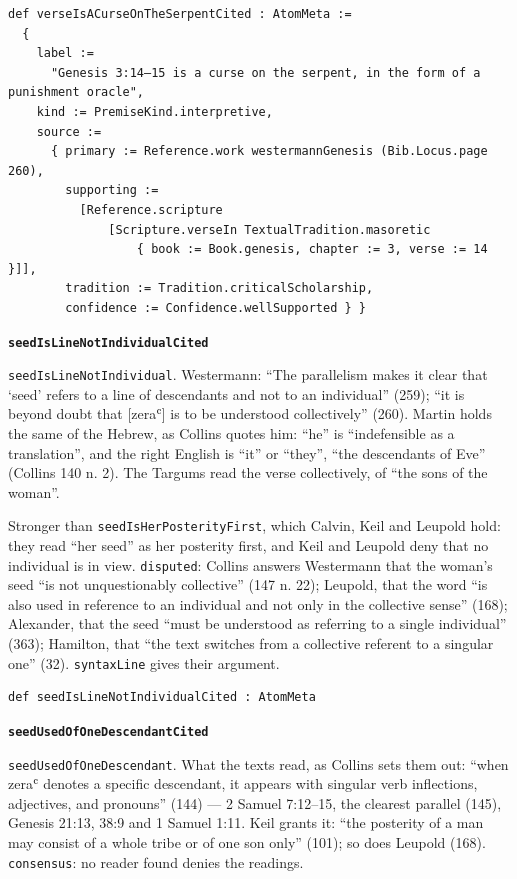 \documentclass[11pt]{article}
\begin{document}
{\small\begin{verbatim}
def verseIsACurseOnTheSerpentCited : AtomMeta :=
  {
    label :=
      "Genesis 3:14–15 is a curse on the serpent, in the form of a punishment oracle",
    kind := PremiseKind.interpretive,
    source :=
      { primary := Reference.work westermannGenesis (Bib.Locus.page 260),
        supporting :=
          [Reference.scripture
              [Scripture.verseIn TextualTradition.masoretic
                  { book := Book.genesis, chapter := 3, verse := 14 }]],
        tradition := Tradition.criticalScholarship,
        confidence := Confidence.wellSupported } }
\end{verbatim}}
\par\medskip\noindent\textbf{\texttt{seed\allowbreak{}Is\allowbreak{}Line\allowbreak{}Not\allowbreak{}Individual\allowbreak{}Cited}}\par\nobreak\noindent
\texttt{seed\allowbreak{}Is\allowbreak{}Line\allowbreak{}Not\allowbreak{}Individual}. Westermann: “The parallelism makes it clear that ‘seed’ refers to a line of descendants and not to an individual” (259); “it is beyond doubt that [zeraʿ] is to be understood collectively” (260). Martin holds the same of the Hebrew, as Collins quotes him: “he” is “indefensible as a translation”, and the right English is “it” or “they”, “the descendants of Eve” (Collins 140 n. 2). The Targums read the verse collectively, of “the sons of the woman”.

Stronger than \texttt{seed\allowbreak{}Is\allowbreak{}Her\allowbreak{}Posterity\allowbreak{}First}, which Calvin, Keil and Leupold hold: they read “her seed” as her posterity first, and Keil and Leupold deny that no individual is in view. \texttt{disputed}: Collins answers Westermann that the woman’s seed “is not unquestionably collective” (147 n. 22); Leupold, that the word “is also used in reference to an individual and not only in the collective sense” (168); Alexander, that the seed “must be understood as referring to a single individual” (363); Hamilton, that “the text switches from a collective referent to a singular one” (32). \texttt{syntax\allowbreak{}Line} gives their argument.

{\small\begin{verbatim}
def seedIsLineNotIndividualCited : AtomMeta
\end{verbatim}}
\par\medskip\noindent\textbf{\texttt{seed\allowbreak{}Used\allowbreak{}Of\allowbreak{}One\allowbreak{}Descendant\allowbreak{}Cited}}\par\nobreak\noindent
\texttt{seed\allowbreak{}Used\allowbreak{}Of\allowbreak{}One\allowbreak{}Descendant}. What the texts read, as Collins sets them out: “when zeraʿ denotes a specific descendant, it appears with singular verb inflections, adjectives, and pronouns” (144) — 2 Samuel 7:12–15, the clearest parallel (145), Genesis 21:13, 38:9 and 1 Samuel 1:11. Keil grants it: “the posterity of a man may consist of a whole tribe or of one son only” (101); so does Leupold (168). \texttt{consensus}: no reader found denies the readings.
\end{document}
